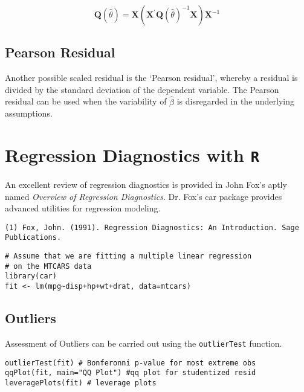 \[ \boldsymbol{Q} (\hat{\theta}) = \boldsymbol{X} ( \boldsymbol{X}^{\prime}\boldsymbol{Q} (\hat{\theta})^{-1}\boldsymbol{X})\boldsymbol{X}^{-1} \]

\subsection{Pearson Residual}%

Another possible scaled residual is the  `Pearson residual', whereby a residual is divided by the standard deviation of the dependent variable. The Pearson residual can be used when the variability of $\hat{\beta}$ is disregarded in the underlying assumptions.






\newpage
\section{Regression Diagnostics with \texttt{R} }

An excellent review of regression diagnostics is provided in John Fox's aptly named \textit{Overview of Regression Diagnostics}. Dr. Fox's car package provides advanced utilities for regression modeling.

\begin{verbatim}
(1) Fox, John. (1991). Regression Diagnostics: An Introduction. Sage Publications.
\end{verbatim}

\begin{framed}
\begin{verbatim}
# Assume that we are fitting a multiple linear regression
# on the MTCARS data
library(car)
fit <- lm(mpg~disp+hp+wt+drat, data=mtcars)

\end{verbatim}
\end{framed}


\subsection{Outliers}

Assessment of Outliers can be carried out using the \texttt{outlierTest} function.

\begin{framed}
\begin{verbatim}
outlierTest(fit) # Bonferonni p-value for most extreme obs
qqPlot(fit, main="QQ Plot") #qq plot for studentized resid 
leveragePlots(fit) # leverage plots
\end{verbatim}
\end{framed}
